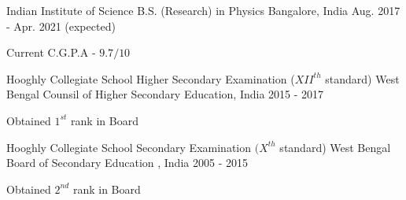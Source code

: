 

\begin{cventries}

  \cventry
    {Indian Institute of Science} %
    {B.S. (Research) in Physics} %
    {Bangalore, India} %
    {Aug. 2017 - Apr. 2021 (expected)} %
    {
      \begin{cvitems} %
        \item {Current C.G.P.A - $9.7/10$}
      \end{cvitems}
    }
  \cventry
	{Hooghly Collegiate School} %
	{Higher Secondary Examination ($XII^{th}$ standard)} %
	{West Bengal Counsil of Higher Secondary Education, India} %
	{2015 - 2017} %
	{
	\begin{cvitems} %
		\item {Obtained $1^{st}$ rank in Board}
	\end{cvitems}
	}
  \cventry
	{Hooghly Collegiate School} %
	{Secondary Examination $(X^{th}$ standard)} %
	{West Bengal Board of Secondary Education , India} %
	{2005 - 2015} %
	{
	\begin{cvitems} %
		\item {Obtained $2^{nd}$ rank in Board}
	\end{cvitems}
	}


\end{cventries}
